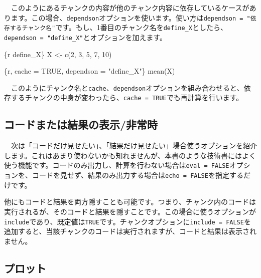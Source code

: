 \documentclass[
  a4paper,
  pandoc,
  ja=standard,
  jafont=haranoaji]{bxjsbook}
\newenvironment{Shaded}{\begin{snugshade}}{\end{snugshade}}
\newcommand{\DecValTok}[1]{\textcolor[rgb]{0.68,0.00,0.00}{#1}}
\newcommand{\FunctionTok}[1]{\textcolor[rgb]{0.28,0.35,0.67}{#1}}
\newcommand{\InformationTok}[1]{\textcolor[rgb]{0.37,0.37,0.37}{#1}}
\newcommand{\NormalTok}[1]{\textcolor[rgb]{0.00,0.48,0.65}{#1}}
\newcommand{\OtherTok}[1]{\textcolor[rgb]{0.00,0.48,0.65}{#1}}
\begin{document}
　このようにあるチャンクの内容が他のチャンク内容に依存しているケースがあります。この場合、\texttt{dependson}オプションを使います。使い方は\texttt{dependson\ =\ "依存するチャンク名"}です。もし、1番目のチャンク名を\texttt{define\_X}としたら、\texttt{dependson\ =\ "define\_X"}とオプションを加えます。

\begin{Shaded}
\begin{Highlighting}[]
\InformationTok{\textasciigrave{}\textasciigrave{}\textasciigrave{}\{r define\_X\}}
\NormalTok{X }\OtherTok{\textless{}{-}} \FunctionTok{c}\NormalTok{(}\DecValTok{2}\NormalTok{, }\DecValTok{3}\NormalTok{, }\DecValTok{5}\NormalTok{, }\DecValTok{7}\NormalTok{, }\DecValTok{10}\NormalTok{)}
\InformationTok{\textasciigrave{}\textasciigrave{}\textasciigrave{}}

\InformationTok{\textasciigrave{}\textasciigrave{}\textasciigrave{}\{r, cache = TRUE, dependson = "define\_X"\}}
\FunctionTok{mean}\NormalTok{(X)}
\InformationTok{\textasciigrave{}\textasciigrave{}\textasciigrave{}}
\end{Highlighting}
\end{Shaded}

　このようにチャンク名と\texttt{cache}、\texttt{dependson}オプションを組み合わせると、依存するチャンクの中身が変わったら、\texttt{cache\ =\ TRUE}でも再計算を行います。

\hypertarget{ux30b3ux30fcux30c9ux307eux305fux306fux7d50ux679cux306eux8868ux793aux975eux5e38ux6642}{%
\subsection{コードまたは結果の表示/非常時}\label{ux30b3ux30fcux30c9ux307eux305fux306fux7d50ux679cux306eux8868ux793aux975eux5e38ux6642}}

　次は「コードだけ見せたい」、「結果だけ見せたい」場合使うオプションを紹介します。これはあまり使わないかも知れませんが、本書のような技術書にはよく使う機能です。コードのみ出力し、計算を行わない場合は\texttt{eval\ =\ FALSE}オプションを、コードを見せず、結果のみ出力する場合は\texttt{echo\ =\ FALSE}を指定するだけです。

他にもコードと結果を両方隠すことも可能です。つまり、チャンク内のコードは実行されるが、そのコードと結果を隠すことです。この場合に使うオプションが\texttt{include}であり、既定値は\texttt{TRUE}です。チャンクオプションに\texttt{include\ =\ FALSE}を追加すると、当該チャンクのコードは実行されますが、コードと結果は表示されません。

\hypertarget{ux30d7ux30edux30c3ux30c8}{%
\subsection{プロット}\label{ux30d7ux30edux30c3ux30c8}}
\end{document}
